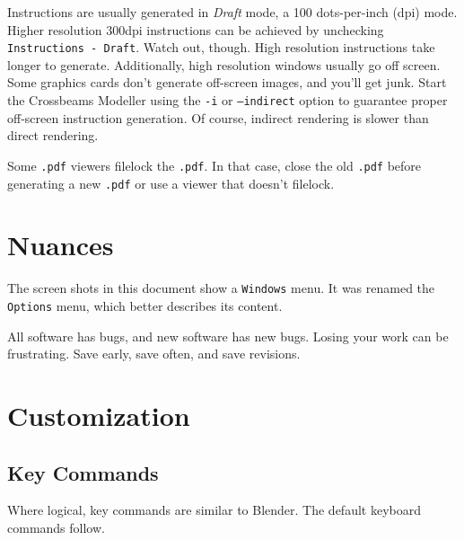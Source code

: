 \documentclass[12pt]{report}
\begin{document}
Instructions are usually generated in \emph{Draft} mode, a 100
dots-per-inch (dpi) mode.  Higher resolution 300dpi instructions can
be achieved by unchecking {\tt Instructions - Draft}.  Watch out,
though.  High resolution instructions take longer to generate.
Additionally, high resolution windows usually go off screen.  Some
graphics cards don't generate off-screen images, and you'll get junk.
Start the Crossbeams Modeller using the {\tt -i} or {\tt --indirect}
option to guarantee proper off-screen instruction generation.  Of
course, indirect rendering is slower than direct rendering.

Some {\tt .pdf} viewers filelock the {\tt .pdf}.  In that case, close
the old {\tt .pdf} before generating a new {\tt .pdf} or use a viewer
that doesn't filelock.

\section{Nuances}

The screen shots in this document show a {\tt Windows} menu.  It was
renamed the {\tt Options} menu, which better describes its content.

All software has bugs, and new software has new bugs.  Losing your
work can be frustrating.  Save early, save often, and save revisions.

\section{Customization}

\subsection{Key Commands}

Where logical, key commands are similar to Blender.  The default
keyboard commands follow.
\end{document}
